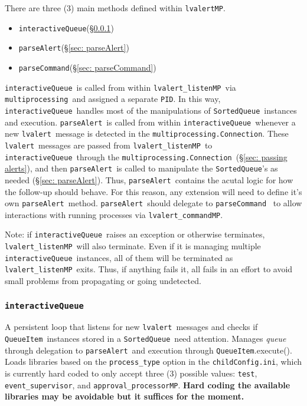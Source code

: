 \documentclass{article}
\newcommand{\PID}{\texttt{PID}}
\newcommand{\multiprocessing}{\texttt{multiprocessing}}
\newcommand{\multiprocessingConnection}{\texttt{multiprocessing.Connection}}
\newcommand{\alert}{\texttt{lvalert}}
\newcommand{\lvalertMP}{\texttt{lvalertMP}}
\newcommand{\lvalertListenMP}{\texttt{lvalert\_listenMP}}
\newcommand{\lvalertCommandMP}{\texttt{lvalert\_commandMP}}
\newcommand{\interactiveQueue}{\texttt{interactiveQueue}}
\newcommand{\parseAlert}{\texttt{parseAlert}}
\newcommand{\parseCommand}{\texttt{parseCommand}}
\newcommand{\SortedQueue}{\texttt{SortedQueue}}
\newcommand{\QueueItem}{\texttt{QueueItem}}
\newcommand{\childConfigini}{\texttt{childConfig.ini}}
\newcommand{\approvalProcessor}{\texttt{approval\_processor}}
\newcommand{\eventSupervisor}{\texttt{event\_supervisor}}
\begin{document}
There are three (3) main methods defined within \lvalertMP. 
\begin{itemize}
    \item{\interactiveQueue (\S\ref{sec: interactiveQueue})}
    \item{\parseAlert (\S\ref{sec: parseAlert})}
    \item{\parseCommand (\S\ref{sec: parseCommand})}
\end{itemize}
\interactiveQueue~is called from within \lvalertListenMP~via \multiprocessing~and assigned a separate \PID.
In this way, \interactiveQueue~handles most of the manipulations of \SortedQueue~instances and execution.
\parseAlert~is called from within \interactiveQueue~whenever a new \alert~message is detected in the \multiprocessingConnection.
These \alert~messages are passed from \lvalertListenMP~to \interactiveQueue~through the \multiprocessingConnection~(\S\ref{sec: passing alerts}), and then \parseAlert~is called to manipulate the \SortedQueue's as needed (\S\ref{sec: parseAlert}).
Thus, \parseAlert~contains the acutal logic for how the follow-up should behave.
For this reason, any extension will need to define it's own \parseAlert~method.
\parseAlert~should delegate to \parseCommand~ to allow interactions with running processes via \lvalertCommandMP.

Note: if \interactiveQueue~raises an exception or otherwise terminates, \lvalertListenMP~will also terminate.
Even if it is managing multiple \interactiveQueue~instances, all of them will be terminated as \lvalertListenMP~exits.
Thus, if anything fails it, all fails in an effort to avoid small problems from propagating or going undetected.


\subsubsection{\interactiveQueue}
\label{sec: interactiveQueue}

A persistent loop that listens for new \alert~messages and checks if \QueueItem~instances stored in a \SortedQueue~need attention. 
Manages \textit{queue} through delegation to \parseAlert~and execution through \QueueItem.execute(). 
Loads libraries based on the \texttt{process\_type} option in the \childConfigini, which is currently hard coded to only accept three (3) possible values: \texttt{test}, \eventSupervisor, and \approvalProcessor\texttt{MP}.
\textbf{Hard coding the available libraries may be avoidable but it suffices for the moment.}
\end{document}
